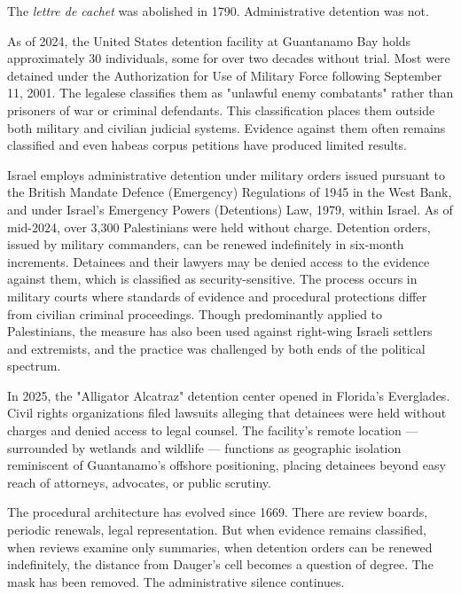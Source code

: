 \begin{commentary}
The \textit{lettre de cachet} was abolished in 1790. Administrative detention was not.

As of 2024, the United States detention facility at Guantanamo Bay holds approximately 30 individuals, some for over two decades without trial. Most were detained under the Authorization for Use of Military Force following September 11, 2001. The legalese classifies them as "unlawful enemy combatants" rather than prisoners of war or criminal defendants. This classification places them outside both military and civilian judicial systems. Evidence against them often remains classified and even habeas corpus petitions have produced limited results. 

Israel employs administrative detention under military orders issued pursuant to the British Mandate Defence (Emergency) Regulations of 1945 in the West Bank, and under Israel's Emergency Powers (Detentions) Law, 1979, within Israel. As of mid-2024, over 3,300 Palestinians were held without charge. Detention orders, issued by military commanders, can be renewed indefinitely in six-month increments. Detainees and their lawyers may be denied access to the evidence against them, which is classified as security-sensitive. The process occurs in military courts where standards of evidence and procedural protections differ from civilian criminal proceedings. Though predominantly applied to Palestinians, the measure has also been used against right-wing Israeli settlers and extremists, and the practice was challenged by both ends of the political spectrum.

In 2025, the "Alligator Alcatraz" detention center opened in Florida's Everglades. Civil rights organizations filed lawsuits alleging that detainees were held without charges and denied access to legal counsel. The facility's remote location — surrounded by wetlands and wildlife — functions as geographic isolation reminiscent of Guantanamo's offshore positioning, placing detainees beyond easy reach of attorneys, advocates, or public scrutiny.

The procedural architecture has evolved since 1669. There are review boards, periodic renewals, legal representation. But when evidence remains classified, when reviews examine only summaries, when detention orders can be renewed indefinitely, the distance from Dauger's cell becomes a question of degree. The mask has been removed. The administrative silence continues.
\end{commentary}

